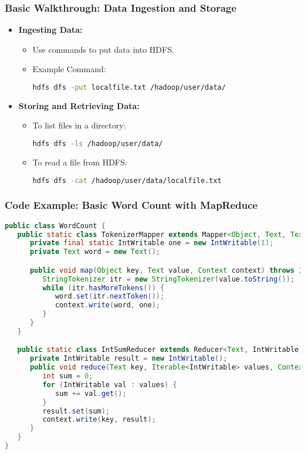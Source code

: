 \documentclass[aspectratio=169]{beamer}
\begin{document}
\begin{frame}[fragile]
    \frametitle{Basic Walkthrough: Data Ingestion and Storage}
    \begin{itemize}
        \item \textbf{Ingesting Data:}
        \begin{itemize}
            \item Use commands to put data into HDFS.
            \item Example Command:
            \begin{lstlisting}[language=bash]
hdfs dfs -put localfile.txt /hadoop/user/data/
            \end{lstlisting}
        \end{itemize}

        \item \textbf{Storing and Retrieving Data:}
        \begin{itemize}
            \item To list files in a directory:
            \begin{lstlisting}[language=bash]
hdfs dfs -ls /hadoop/user/data/
            \end{lstlisting}
            \item To read a file from HDFS:
            \begin{lstlisting}[language=bash]
hdfs dfs -cat /hadoop/user/data/localfile.txt
            \end{lstlisting}
        \end{itemize}
    \end{itemize}
\end{frame}

\begin{frame}[fragile]
    \frametitle{Code Example: Basic Word Count with MapReduce}
    \begin{lstlisting}[language=java]
public class WordCount {
   public static class TokenizerMapper extends Mapper<Object, Text, Text, IntWritable> {
      private final static IntWritable one = new IntWritable(1);
      private Text word = new Text();

      public void map(Object key, Text value, Context context) throws IOException, InterruptedException {
         StringTokenizer itr = new StringTokenizer(value.toString());
         while (itr.hasMoreTokens()) {
            word.set(itr.nextToken());
            context.write(word, one);
         }
      }
   }

   public static class IntSumReducer extends Reducer<Text, IntWritable, Text, IntWritable> {
      private IntWritable result = new IntWritable();
      public void reduce(Text key, Iterable<IntWritable> values, Context context) throws IOException, InterruptedException {
         int sum = 0;
         for (IntWritable val : values) {
            sum += val.get();
         }
         result.set(sum);
         context.write(key, result);
      }
   }
}
    \end{lstlisting}
\end{frame}
\end{document}
